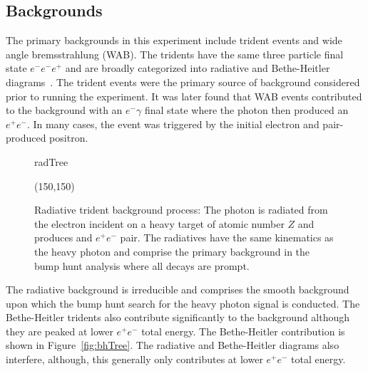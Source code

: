 \subsection{Backgrounds}

The primary backgrounds in this experiment include trident events and wide angle bremsstrahlung (WAB). The tridents have the same three particle final state $e^-e^-e^+$ and are broadly categorized into radiative and Bethe-Heitler diagrams~\cite{bjorken_new_2009}. The trident events were the primary source of background considered prior to running the experiment. It was later found that WAB events contributed to the background with an $e^-\gamma$ final state where the photon then produced an $e^+e^-$. In many cases, the event was triggered by the initial electron and pair-produced positron. 

\begin{figure}[htb]
    \begin{center}
	\begin{fmffile}{radTree}
	\begin{fmfgraph*}(150,150)
	\fmfstraight
		\fmffreeze
		\fmffreeze	
	\end{fmfgraph*}
	\end{fmffile}
  	\end{center}
    	\caption[Radiative background]{Radiative trident background process: The photon is radiated from the electron incident on a heavy target of atomic number $Z$ and produces and $e^+e^-$ pair. The radiatives have the same kinematics as the heavy photon and comprise the primary background in the bump hunt analysis where all decays are prompt. }
   	 \label{fig:radTree}	
\end{figure}

The radiative background is irreducible and comprises the smooth background upon which the bump hunt search for the heavy photon signal is conducted. The Bethe-Heitler tridents also contribute significantly to the background although they are peaked at lower $e^+e^-$ total energy. The Bethe-Heitler contribution is shown in Figure~\ref{fig:bhTree}. The radiative and Bethe-Heitler diagrams also interfere, although, this generally only contributes at lower $e^+e^-$ total energy. 

